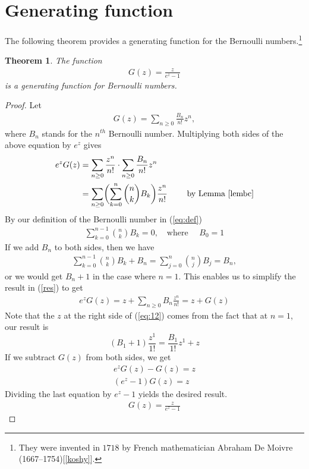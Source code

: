 \documentclass{article}
\newtheorem{thm}{Theorem}[section]
\theoremstyle{definition}
\begin{document}
\section{Generating function}
The following theorem provides a generating function for the Bernoulli numbers.\footnote{They were invented in $1718$ by French mathematician Abraham De Moivre (1667–1754)[\ref{koshy}].}
\begin{thm}\label{thmg}%
The function
\begin{align*}
G(z)=\frac{z}{e^z-1}
\end{align*}
is a generating function for Bernoulli numbers.
\end{thm}

\begin{proof}
Let
\begin{align*}
G(z)=\sum_{n\ge0}\frac{B_n}{n!}z^n,
\end{align*}
where $B_n$ stands for the $n^{th}$ Bernoulli number. Multiplying both sides of the above equation by $e^z$ gives
\begin{align}
e^zG(z)&=\sum_{n\ge0}\frac{z^n}{n!}\cdot\sum_{n\ge0}\frac{B_n}{n!}z^n\nonumber\\
&=\sum_{n\ge0}\biggl( \sum_{k=0}^{n}\binom{n}{k}B_k\biggl)\frac{z^n}{n!}\qquad \text{ by Lemma } \ref{lembc} \label{res}
\end{align}
By our definition of the Bernoulli number in (\ref{eq:def})
\begin{align*}
\sum_{k=0}^{n-1}\binom{n}{k}B_k=0,\quad \mbox{where }\quad  B_0=1
\end{align*}
If we add $B_n$ to both sides, then we have
\begin{align}
\sum_{k=0}^{n-1}\binom{n}{k}B_k+B_n=\sum_{j=0}^{n}\binom{n}{j}B_j=B_n,
\end{align}
or we would get $B_n+1$ in the case where $n=1$. This enables us to simplify the result in (\ref{res}) to get
\begin{align}\label{eq:12}
e^zG(z)=z+\sum_{n\ge0}B_n\frac{z^n}{n!}=z+G(z)
\end{align}
Note that the $z$ at the right side of (\ref{eq:12}) comes from the fact that at $n=1$, our result is
\[
(B_1+1)\frac{z^1}{1!}=\frac{B_1}{1!}z^1+z
\]
If we subtract $G(z)$ from both sides, we get
\begin{align*}
e^zG(z)-G(z)=z\\
(e^z-1)G(z)=z
\end{align*}
Dividing the last equation by $e^z-1$ yields the desired result.
\begin{align}
G(z)=\frac{z}{e^z-1}
\end{align}
\end{proof}
\end{document}

